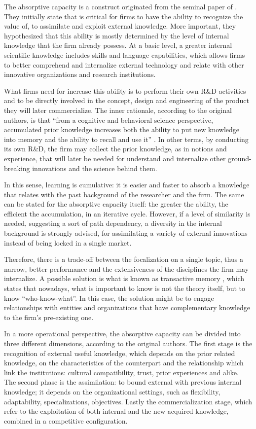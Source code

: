 The absorptive capacity is a construct originated from the seminal paper of \citet{Cohen1990}. They initially state that is critical for firms to have the ability to recognize the value of, to assimilate and exploit external knowledge. More important, they hypothesized that this ability is mostly determined by the level of internal knowledge that the firm already possess. At a basic level, a greater internal scientific knowledge includes skills and language capabilities, which allows firms to better comprehend and internalize external technology and relate with other innovative organizations and research institutions.

What firms need for increase this ability is to perform their own R\&D activities and to be directly involved in the concept, design and engineering of the product they will later commercialize. The inner rationale, according to the original authors, is that \enquote{from a cognitive and behavioral science perspective, accumulated prior knowledge increases both the ability to put new knowledge into memory and the ability to recall and use it} \citep{Cohen1990}. In other terms, by conducting its own R\&D, the firm may collect the prior knowledge, as in notions and experience, that will later be needed for understand and internalize other ground-breaking innovations and the science behind them. 

In this sense, learning is cumulative: it is easier and faster to absorb a knowledge that relates with the past background of the researcher and the firm. The same can be stated for the absorptive capacity itself: the greater the ability, the efficient the accumulation, in an iterative cycle. However, if a level of similarity is needed, suggesting a sort of path dependency, a diversity in the internal background is strongly advised, for assimilating a variety of external innovations instead of being locked in a single market. 

Therefore, there is a trade-off between the focalization on a single topic, thus a narrow, better performance and the extensiveness of the disciplines the firm may internalize. A possible solution is what is known as transactive memory \citep{Wegner1987}, which states that nowadays, what is important to know is not the theory itself, but to know \enquote{who-know-what}. In this case, the solution might be to engage relationships with entities and organizations that have complementary knowledge to the firm's pre-existing one. 

In a more operational perspective, the absorptive capacity can be divided into three different dimensions, according to the original authors. The first stage is the recognition of external useful knowledge, which depends on the prior related knowledge, on the characteristics of the counterpart and the relationship which link the institutions: cultural compatibility, trust, prior experiences and alike. The second phase is the assimilation: to bound external with previous internal knowledge; it depends on the organizational settings, such as flexibility, adaptability, specializations, objectives. Lastly the commercialization stage, which refer to the exploitation of both internal and the new acquired knowledge, combined in a competitive configuration.

